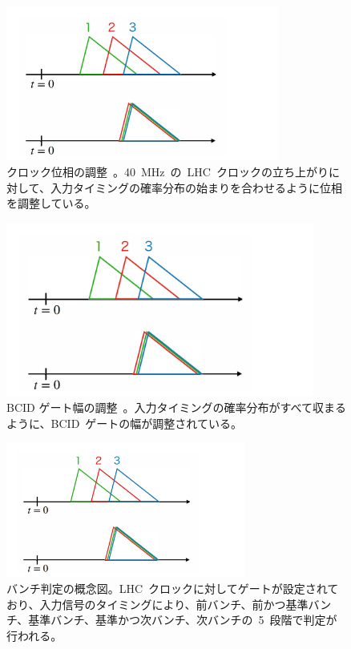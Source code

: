 \begin{figure}[tbp]
        \centering   
        \includegraphics[width=0.8\textwidth,page=2]{img/slide/slide.pdf}
        \caption[クロック位相の調整]{クロック位相の調整~\cite{URL:09}。40~MHz~の~LHC~クロックの立ち上がりに対して、入力タイミングの確率分布の始まりを合わせるように位相を調整している。}
        \label{fig:clock}
\end{figure}
\begin{figure}[tbp]
        \centering   
        \includegraphics[width=0.9\textwidth,page=3]{img/slide/slide.pdf}
        \caption[BCID~ゲート幅の調整]{BCID ゲート幅の調整~\cite{URL:09}。入力タイミングの確率分布がすべて収まるように、BCID~ゲートの幅が調整されている。}
        \label{fig:gate0}
\end{figure}
\begin{figure}[tbp]
        \centering   
        \includegraphics[width=0.7\textwidth,page=4]{img/slide/slide.pdf}
        \caption[バンチ判定の概念図]{バンチ判定の概念図。LHC~クロックに対してゲートが設定されており、入力信号のタイミングにより、前バンチ、前かつ基準バンチ、基準バンチ、基準かつ次バンチ、次バンチの~5~段階で判定が行われる。}
        \label{fig:bcid0}
\end{figure}

